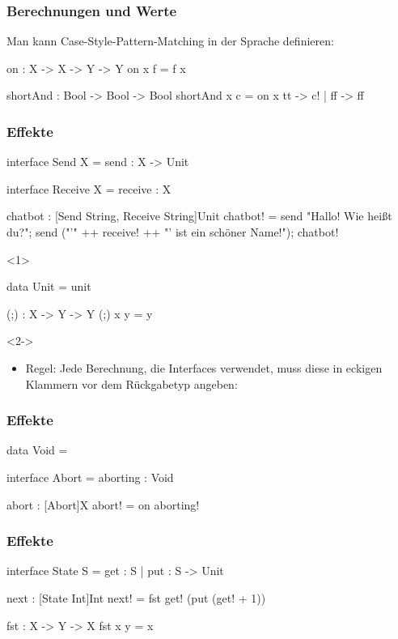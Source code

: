 \documentclass{beamer}
\begin{document}
\begin{frame}[fragile]
  \frametitle{Berechnungen und Werte}

Man kann Case-Style-Pattern-Matching in der Sprache definieren:

\begin{frankcode}
on : X -> {X -> Y} -> Y
on x f = f x

shortAnd : Bool -> {Bool} -> Bool
shortAnd x c = on x { tt -> c! | ff -> ff }
\end{frankcode}
\end{frame}

\begin{frame}[fragile]
  \frametitle{Effekte}

\begin{frankcode}
interface Send X = send : X -> Unit 

interface Receive X = receive : X

chatbot : {[Send String, Receive String]Unit}
chatbot! =
  send "Hallo! Wie heißt du?";
  send ("'" ++ receive! ++ "' ist ein schöner Name!");
  chatbot!
\end{frankcode}

\begin{onlyenv}<1>
\begin{frankcode}
data Unit = unit

(;) : X -> Y -> Y
(;) x y = y
\end{frankcode}
\end{onlyenv}

\begin{onlyenv}<2->
\begin{itemize}
  \item<2-> Regel: Jede Berechnung, die Interfaces verwendet, muss diese in eckigen Klammern vor dem Rückgabetyp angeben:
\end{itemize}
\end{onlyenv}
\end{frame}

\begin{frame}[fragile]
  \frametitle{Effekte}

\begin{frankcode}
data Void =

interface Abort = aborting : Void

abort : [Abort]X
abort! = on aborting! {}
\end{frankcode}
\end{frame}

\begin{frame}[fragile]
  \frametitle{Effekte}

\begin{frankcode}
interface State S = get : S
                  | put : S -> Unit

next : [State Int]Int
next! = fst get! (put (get! + 1))

fst : X -> Y -> X
fst x y = x
\end{frankcode}
\end{frame}
\end{document}

